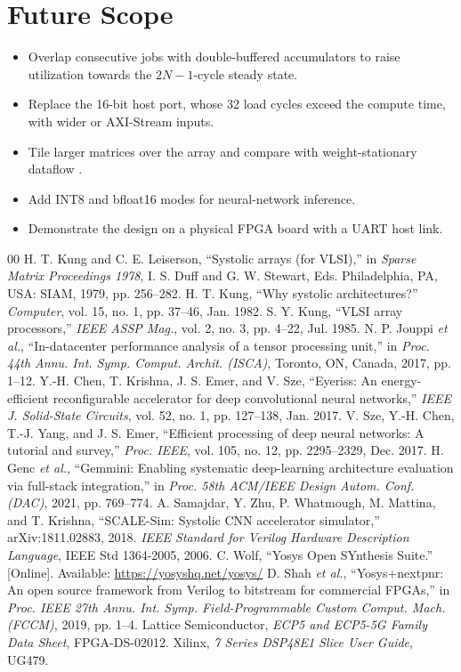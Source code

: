 \documentclass[conference]{IEEEtran}
\begin{document}
\section{Future Scope}
\begin{itemize}
\item Overlap consecutive jobs with double-buffered accumulators to raise utilization towards the $2N-1$-cycle steady state.
\item Replace the 16-bit host port, whose 32 load cycles exceed the compute time, with wider or AXI-Stream inputs.
\item Tile larger matrices over the array and compare with weight-stationary dataflow \cite{jouppi2017,sze2017}.
\item Add INT8 and bfloat16 modes for neural-network inference.
\item Demonstrate the design on a physical FPGA board with a UART host link.
\end{itemize}

\begin{thebibliography}{00}
 H. T. Kung and C. E. Leiserson, ``Systolic arrays (for VLSI),'' in \emph{Sparse Matrix Proceedings 1978}, I. S. Duff and G. W. Stewart, Eds. Philadelphia, PA, USA: SIAM, 1979, pp. 256--282.
 H. T. Kung, ``Why systolic architectures?'' \emph{Computer}, vol. 15, no. 1, pp. 37--46, Jan. 1982.
 S. Y. Kung, ``VLSI array processors,'' \emph{IEEE ASSP Mag.}, vol. 2, no. 3, pp. 4--22, Jul. 1985.
 N. P. Jouppi \emph{et al.}, ``In-datacenter performance analysis of a tensor processing unit,'' in \emph{Proc. 44th Annu. Int. Symp. Comput. Archit. (ISCA)}, Toronto, ON, Canada, 2017, pp. 1--12.
 Y.-H. Chen, T. Krishna, J. S. Emer, and V. Sze, ``Eyeriss: An energy-efficient reconfigurable accelerator for deep convolutional neural networks,'' \emph{IEEE J. Solid-State Circuits}, vol. 52, no. 1, pp. 127--138, Jan. 2017.
 V. Sze, Y.-H. Chen, T.-J. Yang, and J. S. Emer, ``Efficient processing of deep neural networks: A tutorial and survey,'' \emph{Proc. IEEE}, vol. 105, no. 12, pp. 2295--2329, Dec. 2017.
 H. Genc \emph{et al.}, ``Gemmini: Enabling systematic deep-learning architecture evaluation via full-stack integration,'' in \emph{Proc. 58th ACM/IEEE Design Autom. Conf. (DAC)}, 2021, pp. 769--774.
 A. Samajdar, Y. Zhu, P. Whatmough, M. Mattina, and T. Krishna, ``SCALE-Sim: Systolic CNN accelerator simulator,'' arXiv:1811.02883, 2018.
 \emph{IEEE Standard for Verilog Hardware Description Language}, IEEE Std 1364-2005, 2006.
 C. Wolf, ``Yosys Open SYnthesis Suite.'' [Online]. Available: \url{https://yosyshq.net/yosys/}
 D. Shah \emph{et al.}, ``Yosys+nextpnr: An open source framework from Verilog to bitstream for commercial FPGAs,'' in \emph{Proc. IEEE 27th Annu. Int. Symp. Field-Programmable Custom Comput. Mach. (FCCM)}, 2019, pp. 1--4.
 Lattice Semiconductor, \emph{ECP5 and ECP5-5G Family Data Sheet}, FPGA-DS-02012.
 Xilinx, \emph{7 Series DSP48E1 Slice User Guide}, UG479.
\end{thebibliography}
\end{document}

